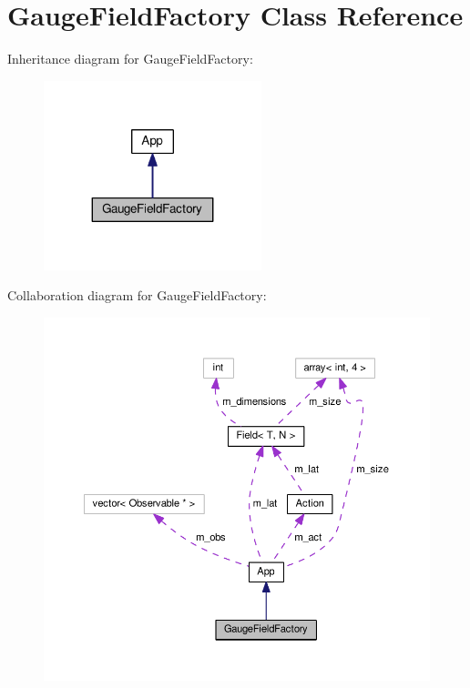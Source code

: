 \hypertarget{classGaugeFieldFactory}{}\section{Gauge\+Field\+Factory Class Reference}
\label{classGaugeFieldFactory}


Inheritance diagram for Gauge\+Field\+Factory\+:\nopagebreak
\begin{figure}[H]
\begin{center}
\leavevmode
\includegraphics[width=179pt]{classGaugeFieldFactory__inherit__graph}
\end{center}
\end{figure}


Collaboration diagram for Gauge\+Field\+Factory\+:\nopagebreak
\begin{figure}[H]
\begin{center}
\leavevmode
\includegraphics[width=350pt]{classGaugeFieldFactory__coll__graph}
\end{center}
\end{figure}
